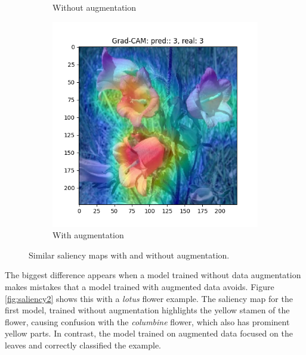 \begin{figure}[h!]
\begin{subfigure}[b]{0.32\textwidth}
        \caption{Without augmentation}
    \end{subfigure}
    \hfill
    \begin{subfigure}[b]{0.32\textwidth}
        \centering
        \includegraphics[width=\textwidth]{Images/saliency-flowers/510/GradCAM_510_aug.png}
        \caption{With augmentation}
    \end{subfigure}
    \caption{Similar saliency maps with and without augmentation.}
    \label{fig:saliency1}
\end{figure}

The biggest difference appears when a model trained without data augmentation makes mistakes that a model trained with augmented data avoids. Figure \ref{fig:saliency2} shows this with a \textit{lotus} flower example. The saliency map for the first model, trained without augmentation highlights the yellow stamen of the flower, causing confusion with the \textit{columbine} flower, which also has prominent yellow parts. In contrast, the model trained on augmented data focused on the leaves and correctly classified the example.


